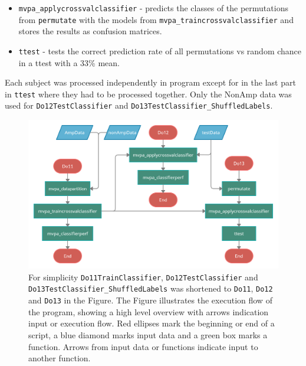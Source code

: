 \documentclass[12pt, a4paper]{article}
\begin{document}
\begin{itemize}
\begin{itemize}
        \item \texttt{mvpa\_applycrossvalclassifier} - predicts the classes of the permutations from \texttt{permutate} with the models from \texttt{mvpa\_traincrossvalclassifier} and stores the results as confusion matrices.
        
        \item \texttt{ttest} - tests the correct prediction rate of all permutations vs random chance in a ttest with a 33\% mean.
    \end{itemize}
\end{itemize}

Each subject was processed independently in program except for in the last part in \texttt{ttest} where they had to be processed together.
Only the NonAmp data was used for \texttt{Do12TestClassifier} and \texttt{Do13TestClassifier\_ShuffledLabels}.


\begin{figure}[H]
    \centering
    \includegraphics[width=1.0\textwidth, ]{pictures/General structure Master Thesis.png}
    \caption{For simplicity \texttt{Do11TrainClassifier}, \texttt{Do12TestClassifier} and \texttt{Do13TestClassifier\_ShuffledLabels} was shortened to \texttt{Do11}, \texttt{Do12} and \texttt{Do13} in the Figure.
    The Figure illustrates the execution flow of the program, showing a high level overview with arrows indication input or execution flow.
    Red ellipses mark the beginning or end of a script, a blue diamond marks input data and a green box marks a function.
    Arrows from input data or functions indicate input to another function.}
    \label{fig:GeneralProgramStructure}
\end{figure}

\end{document}

